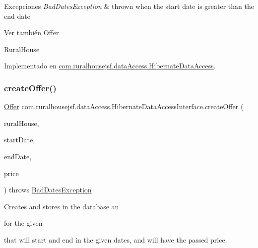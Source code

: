\begin{DoxyExceptions}{Excepciones}
{\em Bad\+Dates\+Exception} & thrown when the start date is greater than the end date\\
\hline
\end{DoxyExceptions}
\begin{DoxySeeAlso}{Ver también}
Offer 

Rural\+House 
\end{DoxySeeAlso}


Implementado en \mbox{\hyperlink{classcom_1_1ruralhousejsf_1_1data_access_1_1_hibernate_data_access_a332f591a06df13d36814ff215008987b}{com.\+ruralhousejsf.\+data\+Access.\+Hibernate\+Data\+Access}}.

\mbox{\label{interfacecom_1_1ruralhousejsf_1_1data_access_1_1_hibernate_data_access_interface_a31f9cb8a3c8f0b42dee19b03f052cd62}} 
\subsubsection{\texorpdfstring{createOffer()}{createOffer()}\hspace{0.1cm}{\footnotesize\ttfamily [2/2]}}
{\footnotesize\ttfamily \mbox{\hyperlink{classcom_1_1ruralhousejsf_1_1domain_1_1_offer}{Offer}} com.\+ruralhousejsf.\+data\+Access.\+Hibernate\+Data\+Access\+Interface.\+create\+Offer (\begin{DoxyParamCaption}\item[{\mbox{\hyperlink{classcom_1_1ruralhousejsf_1_1domain_1_1_rural_house}{Rural\+House}}}]{rural\+House,  }\item[{Date}]{start\+Date,  }\item[{Date}]{end\+Date,  }\item[{double}]{price }\end{DoxyParamCaption}) throws \mbox{\hyperlink{classcom_1_1ruralhousejsf_1_1exceptions_1_1_bad_dates_exception}{Bad\+Dates\+Exception}}}

Creates and stores in the database an
\begin{DoxyCode}{0}
\end{DoxyCode}
 for the given
\begin{DoxyCode}{0}
\end{DoxyCode}
 that will start and end in the given dates, and will have the passed price.


